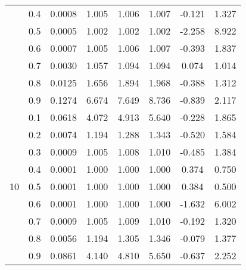 \documentclass[11pt,a4paper]{report}
\begin{document}
\begin{longtable}{ | c | c || c | c | c | c | c | c | }
 & 0.4 & 0.0008 & 1.005 & 1.006 & 1.007 & -0.121 & 1.327 \\
 & 0.5 & 0.0005 & 1.002 & 1.002 & 1.002 & -2.258 & 8.922 \\
 & 0.6 & 0.0007 & 1.005 & 1.006 & 1.007 & -0.393 & 1.837 \\
 & 0.7 & 0.0030 & 1.057 & 1.094 & 1.094 & 0.074 & 1.014 \\
 & 0.8 & 0.0125 & 1.656 & 1.894 & 1.968 & -0.388 & 1.312 \\
 & 0.9 & 0.1274 & 6.674 & 7.649 & 8.736 & -0.839 & 2.117 \\
 \hline
\multirow{9}{*}{10} & 0.1 & 0.0618 & 4.072 & 4.913 & 5.640 & -0.228 & 1.865 \\
 & 0.2 & 0.0074 & 1.194 & 1.288 & 1.343 & -0.520 & 1.584 \\
 & 0.3 & 0.0009 & 1.005 & 1.008 & 1.010 & -0.485 & 1.384 \\
 & 0.4 & 0.0001 & 1.000 & 1.000 & 1.000 & 0.374 & 0.750 \\
 & 0.5 & 0.0001 & 1.000 & 1.000 & 1.000 & 0.384 & 0.500 \\
 & 0.6 & 0.0001 & 1.000 & 1.000 & 1.000 & -1.632 & 6.002 \\
 & 0.7 & 0.0009 & 1.005 & 1.009 & 1.010 & -0.192 & 1.320 \\
 & 0.8 & 0.0056 & 1.194 & 1.305 & 1.346 & -0.079 & 1.377 \\
 & 0.9 & 0.0861 & 4.140 & 4.810 & 5.650 & -0.637 & 2.252 \\
 \hline
\hline
\end{longtable}
\end{document}
